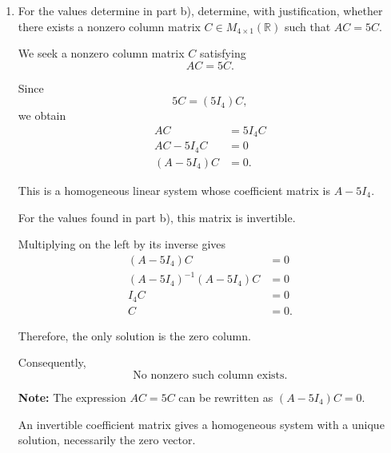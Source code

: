\begin{enumerate}[label=\alph*)]
\begin{answer}
    This matrix is upper triangular. Its diagonal entries are
    $$
    3,\quad a^2-9,\quad
    a^2-9,\quad a-5.
    $$

    Since it is a square matrix of order $4$,
    $$
    A-5I_4\text{ invertible}
    \iff r(A-5I_4)=4.
    $$

    All four diagonal entries must therefore be nonzero.

    Since
    $$
    a^2-9=(a-3)(a+3),
    $$
    the required conditions are
    $$
    a\neq-3,\qquad
    a\neq3,\qquad
    a\neq5.
    $$

    Hence,
    $$
    \boxed{
    a\in\mathbb{R}
    \setminus\{-3,3,5\},
    \qquad b\in\mathbb{R}.
    }
    $$

\end{answer}

\item For the values determine in part b), determine, with
justification, whether there exists a nonzero column matrix
$C\in M_{4\times1}(\mathbb{R})$ such that $AC=5C$.

\begin{answer}
    We seek a nonzero column matrix $C$ satisfying
    $$
    AC=5C.
    $$

    Since
    $$
    5C=(5I_4)C,
    $$
    we obtain
    $$
    \begin{aligned}
    AC&=5I_4C\\
    AC-5I_4C&=0\\
    (A-5I_4)C&=0.
    \end{aligned}
    $$

    This is a homogeneous linear system whose
    coefficient matrix is $A-5I_4$.

    For the values found in part b), this matrix is invertible.

    Multiplying on the left by its inverse gives
    $$
    \begin{aligned}
    (A-5I_4)C&=0\\
    (A-5I_4)^{-1}
    (A-5I_4)C&=0\\
    I_4C&=0\\
    C&=0.
    \end{aligned}
    $$

    Therefore, the only solution is the zero column.

    Consequently,
    $$
    \boxed{
    \text{No nonzero such column exists.}
    }
    $$

    {\color{red}
    \textbf{Note:} The expression
    $AC=5C$ can be rewritten
    as $(A-5I_4)C=0$.

    An invertible coefficient matrix gives a homogeneous
    system with a unique solution, necessarily the zero vector.
    }
\end{answer}

\end{enumerate}
